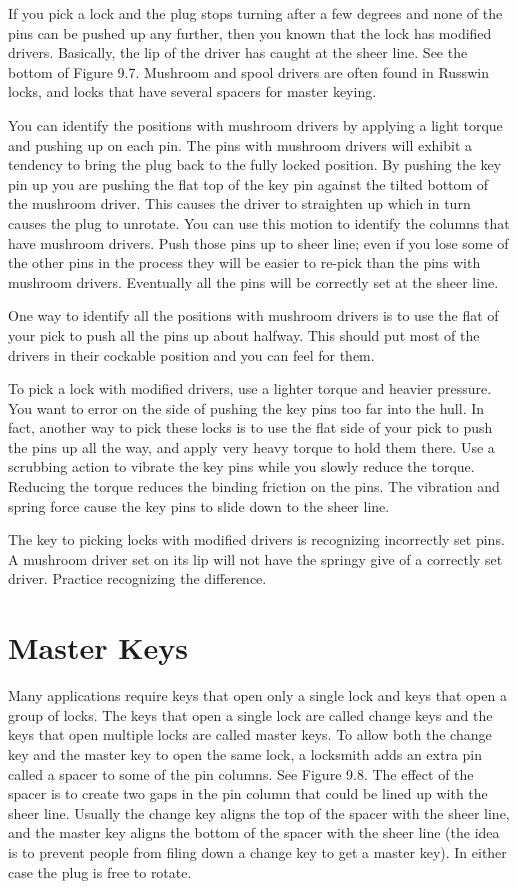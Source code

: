 If you pick a lock and the plug stops turning after a few degrees and none of the pins
can be pushed up any further, then you known that the lock has modified drivers. Basically,
the lip of the driver has caught at the sheer line. See the bottom of Figure 9.7. Mushroom
and spool drivers are often found in Russwin locks, and locks that have several spacers for
master keying.

You can identify the positions with mushroom drivers by applying a light torque and
pushing up on each pin. The pins with mushroom drivers will exhibit a tendency to bring
the plug back to the fully locked position. By pushing the key pin up you are pushing the
flat top of the key pin against the tilted bottom of the mushroom driver. This causes the
driver to straighten up which in turn causes the plug to unrotate. You can use this motion
to identify the columns that have mushroom drivers. Push those pins up to sheer line; even
if you lose some of the other pins in the process they will be easier to re-pick than the pins
with mushroom drivers. Eventually all the pins will be correctly set at the sheer line.

One way to identify all the positions with mushroom drivers is to use the flat of your pick
to push all the pins up about halfway. This should put most of the drivers in their cockable
position and you can feel for them.

To pick a lock with modified drivers, use a lighter torque and heavier pressure. You want
to error on the side of pushing the key pins too far into the hull. In fact, another way to
pick these locks is to use the flat side of your pick to push the pins up all the way, and apply
very heavy torque to hold them there. Use a scrubbing action to vibrate the key pins while
you slowly reduce the torque. Reducing the torque reduces the binding friction on the pins.
The vibration and spring force cause the key pins to slide down to the sheer line.

The key to picking locks with modified drivers is recognizing incorrectly set pins. A
mushroom driver set on its lip will not have the springy give of a correctly set driver.
Practice recognizing the difference.

\section{Master Keys}
Many applications require keys that open only a single lock and keys that open a group
of locks. The keys that open a single lock are called change keys and the keys that open
multiple locks are called master keys. To allow both the change key and the master key to
open the same lock, a locksmith adds an extra pin called a spacer to some of the pin columns.
See Figure 9.8. The effect of the spacer is to create two gaps in the pin column that could
be lined up with the sheer line. Usually the change key aligns the top of the spacer with the
sheer line, and the master key aligns the bottom of the spacer with the sheer line (the idea
is to prevent people from filing down a change key to get a master key). In either case the
plug is free to rotate.

